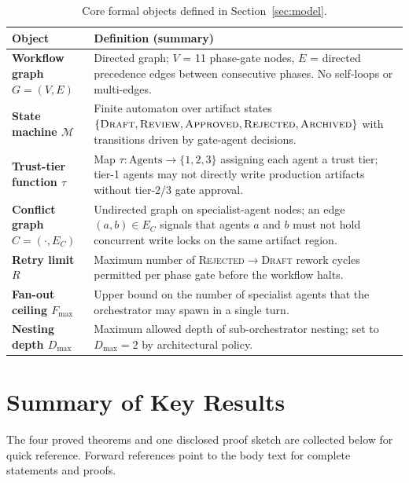 \documentclass[12pt]{article}
\theoremstyle{definition}
\begin{document}
\begin{table}[H]
\centering
\caption{Core formal objects defined in Section~\ref{sec:model}.}
\label{tab:key-defs}
\begin{tabularx}{\linewidth}{@{}>{\bfseries}p{3.2cm} X@{}}
\toprule
Object & Definition (summary) \\
\midrule
Workflow graph $G=(V,E)$ &
  Directed graph; $V$ = 11 phase-gate nodes, $E$ = directed
  precedence edges between consecutive phases.  No self-loops or
  multi-edges. \\[4pt]
State machine $\mathcal{M}$ &
  Finite automaton over artifact states
  $\{\textsc{Draft},\textsc{Review},\textsc{Approved},\textsc{Rejected},\textsc{Archived}\}$
  with transitions driven by gate-agent decisions. \\[4pt]
Trust-tier function $\tau$ &
  Map $\tau: \text{Agents} \to \{1,2,3\}$ assigning each agent a
  trust tier; tier-1 agents may not directly write
  production artifacts without tier-2/3 gate approval. \\[4pt]
Conflict graph $C=(\cdot,E_C)$ &
  Undirected graph on specialist-agent nodes; an edge $(a,b)\in E_C$
  signals that agents $a$ and $b$ must not hold concurrent write
  locks on the same artifact region. \\[4pt]
Retry limit $R$ &
  Maximum number of \textsc{Rejected}$\to$\textsc{Draft} rework
  cycles permitted per phase gate before the workflow halts. \\[4pt]
Fan-out ceiling $F_{\max}$ &
  Upper bound on the number of specialist agents that the orchestrator
  may spawn in a single turn. \\[4pt]
Nesting depth $D_{\max}$ &
  Maximum allowed depth of sub-orchestrator nesting; set to $D_{\max}=2$
  by architectural policy. \\
\bottomrule
\end{tabularx}
\end{table}

\section{Summary of Key Results}
\label{app:key-results}

\noindent The four proved theorems and one disclosed proof sketch are
collected below for quick reference.  Forward references point to the
body text for complete statements and proofs.
\end{document}
